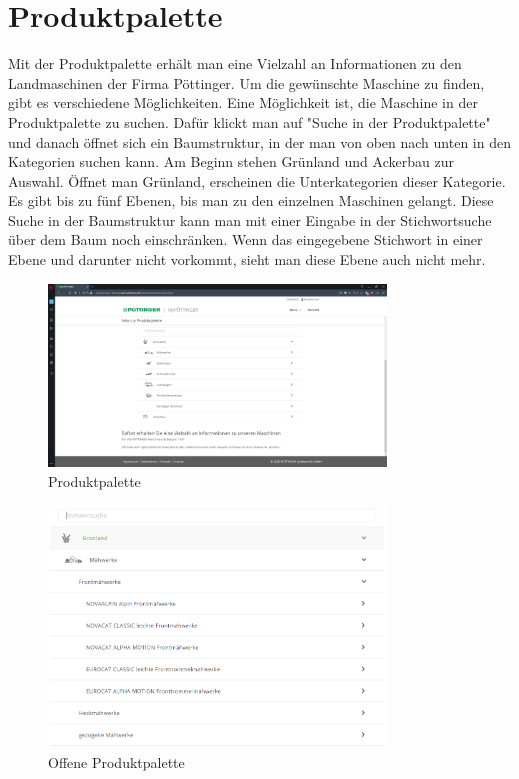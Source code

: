 \section{Produktpalette}
Mit der Produktpalette erhält man eine Vielzahl an Informationen zu den Landmaschinen der Firma Pöttinger. Um die gewünschte Maschine zu finden, gibt es verschiedene Möglichkeiten. Eine Möglichkeit ist, die Maschine in der Produktpalette zu suchen. Dafür klickt man auf "Suche in der Produktpalette" und danach öffnet sich ein Baumstruktur, in der man von oben nach unten in den Kategorien suchen kann. Am Beginn stehen Grünland und Ackerbau zur Auswahl. Öffnet man Grünland, erscheinen die Unterkategorien dieser Kategorie. Es gibt bis zu fünf Ebenen, bis man zu den einzelnen Maschinen gelangt. Diese Suche in der Baumstruktur kann man mit einer Eingabe in der Stichwortsuche über dem Baum noch einschränken. Wenn das eingegebene Stichwort in einer Ebene und darunter nicht vorkommt, sieht man diese Ebene auch nicht mehr.
\begin{figure}[H]
	\centerline{
		\includegraphics[width=0.8\textwidth]{./grafiken/erm_produktpalette.png}
	}
	\vskip0pt
	\caption{Produktpalette} \label{fig:produktpalette}
\end{figure}
\begin{figure}[H]
	\centerline{
		\includegraphics[width=0.8\textwidth]{./grafiken/erm_produktpalette_offen.png}
	}
	\vskip0pt
	\caption{Offene Produktpalette} \label{fig:produktpaletteOffen}
\end{figure}
